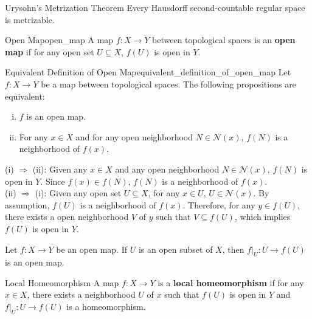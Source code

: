 \documentclass{report}
\begin{document}
\begin{theorem}{Urysohn's Metrization Theorem}{}
	Every Hausdorff second-countable regular space is metrizable.
\end{theorem}

\begin{definition}{Open Map}{open_map}
	A map $f:X\to Y$ between topological spaces is an \textbf{open map} if for any open set $U\subseteq X$, $f(U)$ is open in $Y$.
\end{definition}


\begin{proposition}{Equivalent Definition of Open Map}{equivalent_definition_of_open_map}
	Let $f:X\to Y$ be a map between topological spaces. The following propositions are equivalent:
	\begin{enumerate}[(i)]
		\item $f$ is an open map.
		\item For any $x\in X$ and for any open neighborhood $N\in\mathcal{N}(x)$, $f(N)$ is a neighborhood of $f(x)$.
	\end{enumerate}
\end{proposition}
\begin{prf}
	(i) $\Rightarrow$ (ii): Given any $x\in X$ and any open neighborhood $N\in\mathcal{N}(x)$, $f(N)$ is open in $Y$. Since $f(x)\in f(N)$, $f(N)$ is a neighborhood of $f(x)$.\\
	(ii) $\Rightarrow$ (i): Given any open set $U\subseteq X$, for any $x\in U$, $U\in\mathcal{N}(x)$. By assumption, $f(U)$ is a neighborhood of $f(x)$. Therefore, for any $y\in f(U)$, there exists a open neighborhood $V$ of $y$ such that $V\subseteq f(U)$, which implies $f(U)$ is open in $Y$.
\end{prf}

\begin{proposition}{}{}
	Let $f:X\to Y$ be an open map. If $U$ is an open subset of $X$, then $f|_U:U\to f(U)$ is an open map.
\end{proposition}

\begin{definition}{Local Homeomorphism}{}
	A map $f:X\to Y$ is a \textbf{local homeomorphism} if for any $x\in X$, there exists a neighborhood $U$ of $x$ such that $f(U)$ is open in $Y$ and $f|_U:U\to f(U)$ is a homeomorphism.
\end{definition}
\end{document}
